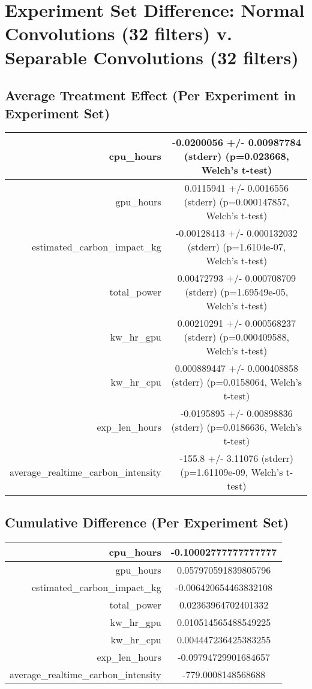 \documentclass{article}%
\begin{document}
%
\normalsize%
\section{Experiment Set Difference: Normal Convolutions (32 filters) v. Separable Convolutions (32 filters)}%
\label{sec:Experiment Set Difference Normal Convolutions (32 filters) v. Separable Convolutions (32 filters)}%
\subsection{Average Treatment Effect (Per Experiment in Experiment Set)}%
\label{subsec:Average Treatment Effect (Per Experiment in Experiment Set)}%
\begin{tabular}{|r|c|}%
\hline%
cpu\_hours&{-}0.0200056 +/{-} 0.00987784 (stderr) (p=0.023668, Welch's t{-}test)\\%
\hline%
gpu\_hours&0.0115941 +/{-} 0.0016556 (stderr) (p=0.000147857, Welch's t{-}test)\\%
\hline%
estimated\_carbon\_impact\_kg&{-}0.00128413 +/{-} 0.000132032 (stderr) (p=1.6104e{-}07, Welch's t{-}test)\\%
\hline%
total\_power&0.00472793 +/{-} 0.000708709 (stderr) (p=1.69549e{-}05, Welch's t{-}test)\\%
\hline%
kw\_hr\_gpu&0.00210291 +/{-} 0.000568237 (stderr) (p=0.000409588, Welch's t{-}test)\\%
\hline%
kw\_hr\_cpu&0.000889447 +/{-} 0.000408858 (stderr) (p=0.0158064, Welch's t{-}test)\\%
\hline%
exp\_len\_hours&{-}0.0195895 +/{-} 0.00898836 (stderr) (p=0.0186636, Welch's t{-}test)\\%
\hline%
average\_realtime\_carbon\_intensity&{-}155.8 +/{-} 3.11076 (stderr) (p=1.61109e{-}09, Welch's t{-}test)\\%
\hline%
\end{tabular}

%
\subsection{Cumulative Difference (Per Experiment Set)}%
\label{subsec:Cumulative Difference (Per Experiment Set)}%
\begin{tabular}{|r|c|}%
\hline%
cpu\_hours&{-}0.10002777777777777\\%
\hline%
gpu\_hours&0.057970591839805796\\%
\hline%
estimated\_carbon\_impact\_kg&{-}0.006420654463832108\\%
\hline%
total\_power&0.02363964702401332\\%
\hline%
kw\_hr\_gpu&0.010514565488549225\\%
\hline%
kw\_hr\_cpu&0.004447236425383255\\%
\hline%
exp\_len\_hours&{-}0.09794729901684657\\%
\hline%
average\_realtime\_carbon\_intensity&{-}779.0008148568688\\%
\hline%
\end{tabular}

%
\end{document}

